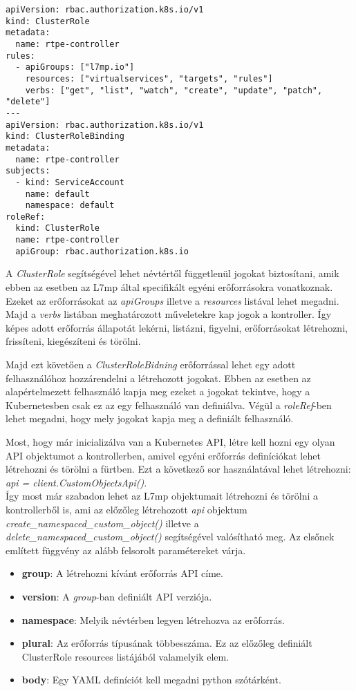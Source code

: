 \begin{lstlisting}[caption=RBAC létrehozása, label=lst:rbac]
apiVersion: rbac.authorization.k8s.io/v1
kind: ClusterRole
metadata:
  name: rtpe-controller
rules:
  - apiGroups: ["l7mp.io"]
    resources: ["virtualservices", "targets", "rules"]
    verbs: ["get", "list", "watch", "create", "update", "patch", "delete"]
---
apiVersion: rbac.authorization.k8s.io/v1
kind: ClusterRoleBinding
metadata:
  name: rtpe-controller
subjects:
  - kind: ServiceAccount
    name: default
    namespace: default
roleRef:
  kind: ClusterRole
  name: rtpe-controller
  apiGroup: rbac.authorization.k8s.io
\end{lstlisting}

A \textit{ClusterRole} segítségével lehet névtértől függetlenül jogokat biztosítani,
amik ebben az esetben az L7mp által specifikált egyéni erőforrásokra vonatkoznak. 
Ezeket az erőforrásokat az \textit{apiGroups} illetve a \textit{resources} listával
lehet megadni. Majd a \textit{verbs} listában meghatározott műveletekre kap 
jogok a kontroller. Így képes adott erőforrás állapotát lekérni, listázni, figyelni,
erőforrásokat létrehozni, frissíteni, kiegészíteni és törölni. 

Majd ezt követően a \textit{ClusterRoleBidning} erőforrással lehet egy adott
felhasználóhoz hozzárendelni a létrehozott jogokat. Ebben az esetben az alapértelmezett
felhasználó kapja meg ezeket a jogokat tekintve, hogy a Kubernetesben csak ez az egy
felhasználó van definiálva. Végül a \textit{roleRef}-ben lehet megadni, hogy mely
jogokat kapja meg a definiált felhasználó. 

Most, hogy már inicializálva van a Kubernetes API, létre kell hozni egy olyan 
API objektumot a kontrollerben, amivel egyéni erőforrás definíciókat lehet létrehozni
és törölni a fürtben. Ezt a következő sor használatával lehet létrehozni: 
\textit{api = client.CustomObjectsApi()}. \\

Így most már szabadon lehet az L7mp objektumait létrehozni és törölni a kontrollerből is, 
ami az előzőleg létrehozott \textit{api} objektum \textit{create\_namespaced\_custom\_object()}
illetve a \textit{delete\_namespaced\_custom\_object()} segítségével valósítható meg. Az elsőnek
említett függvény az alább felsorolt paramétereket várja.

\begin{itemize}
	\item \textbf{group}: A létrehozni kívánt erőforrás API címe.  
	\item \textbf{version}: A \textit{group}-ban definiált API verziója. 
	\item \textbf{namespace}: Melyik névtérben legyen létrehozva az erőforrás.
	\item \textbf{plural}: Az erőforrás típusának többesszáma. Ez az előzőleg definiált
	ClusterRole resources listájából valamelyik elem. 
	\item \textbf{body}: Egy YAML definíciót kell megadni python szótárként. 
\end{itemize}

